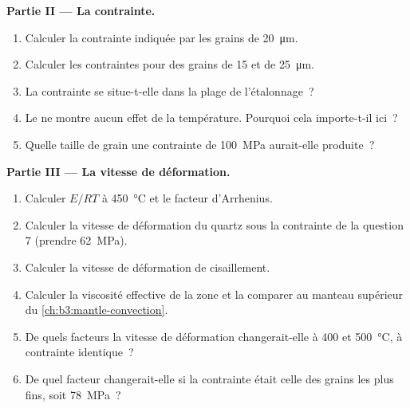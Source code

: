 \begin{problem}
\medskip\noindent\textbf{Partie II --- La contrainte.}
\begin{enumerate}[resume]
  \item Calculer la contrainte indiquée par les grains de \qty{20}{\micro m}.
  \item Calculer les contraintes pour des grains de 15 et de \qty{25}{\micro m}.
  \item La contrainte se situe-t-elle dans la plage de l'étalonnage~?
  \item Le  ne montre aucun effet de la température. Pourquoi cela
        importe-t-il ici~?
  \item Quelle taille de grain une contrainte de \qty{100}{MPa} aurait-elle produite~?
\end{enumerate}

\medskip\noindent\textbf{Partie III --- La vitesse de déformation.}
\begin{enumerate}[resume]
  \item Calculer $E/RT$ à \qty{450}{\celsius} et le facteur d'Arrhenius.
  \item Calculer la vitesse de déformation du quartz sous la contrainte de la question 7
        (prendre \qty{62}{MPa}).
  \item Calculer la vitesse de déformation de cisaillement.
  \item Calculer la viscosité effective de la zone et la comparer au manteau
        supérieur du \cref{ch:b3:mantle-convection}.
  \item De quels facteurs la vitesse de déformation changerait-elle à 400 et
        \qty{500}{\celsius}, à contrainte identique~?
  \item De quel facteur changerait-elle si la contrainte était celle
        des grains les plus fins, soit \qty{78}{MPa}~?
\end{enumerate}


\end{problem}
